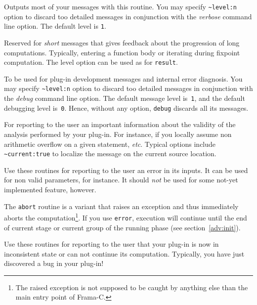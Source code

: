 \begin{description}

  Outputs most of your messages with this routine. You may specify
  \lstinline{~level:n} option to discard too detailed messages in
  conjunction with the \emph{verbose} command line option. The default
  level is \lstinline{1}.

  Reserved for \emph{short} messages that gives feedback about the
  progression of long computations. Typically, entering a function
  body or iterating during fixpoint computation.  The level option can
  be used as for \lstinline{result}.

  To be used for plug-in development messages and internal error
  diagnosis. You may specify \lstinline{~level:n} option to discard
  too detailed messages in conjunction with the \emph{debug} command
  line option. The default message level is~\lstinline{1}, and the
  default debugging level is~\lstinline{0}. Hence, without any option,
  \lstinline{debug} discards all its messages.

  For reporting to the user an important information about the
  validity of the analysis performed by your plug-in. For instance, if
  you locally assume non arithmetic overflow on a given statement,
  \emph{etc}. Typical options include \lstinline{~current:true} to
  localize the message on the current source location.

  Use these routines for reporting to the user an error in its
  inputs. It can be used for non valid parameters, for instance. It
  should \emph{not} be used for some not-yet implemented feature,
  however.

  The \lstinline{abort} routine is a variant that raises an exception
  and thus immediately aborts the computation\footnote{The raised
  exception is not supposed to be caught by anything else than the
  main entry point of Frama-C.}.
  If you use \lstinline{error},
  execution will continue until the end of current stage or current
  group of the running phase (see section~\ref{adv:init}).

  Use these routines for reporting to the user that your plug-in is
  now in inconsistent state or can not continue its
  computation. Typically, you have just discovered a bug in your plug-in!


\end{description}
